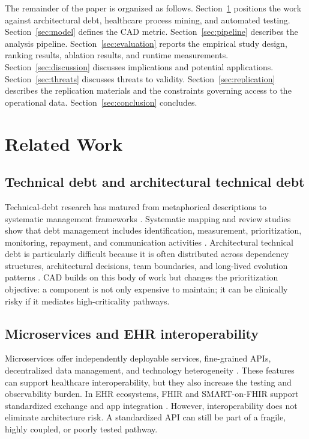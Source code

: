\documentclass[english,preprint]{elsarticle}
\newcommand{\CAD}{\textsc{CAD}\xspace}
\begin{document}
The remainder of the paper is organized as follows. Section~\ref{sec:related} positions the work against architectural debt, healthcare process mining, and automated testing. Section~\ref{sec:model} defines the \CAD metric. Section~\ref{sec:pipeline} describes the analysis pipeline. Section~\ref{sec:evaluation} reports the empirical study design, ranking results, ablation results, and runtime measurements. Section~\ref{sec:discussion} discusses implications and potential applications. Section~\ref{sec:threats} discusses threats to validity. Section~\ref{sec:replication} describes the replication materials and the constraints governing access to the operational data. Section~\ref{sec:conclusion} concludes.

\section{Related Work}\label{sec:related}

\subsection{Technical debt and architectural technical debt}

Technical-debt research has matured from metaphorical descriptions to systematic management frameworks \cite{Cunningham1992WyCash,Kruchten2012TechnicalDebt,Li2015TechnicalDebt}. Systematic mapping and review studies show that debt management includes identification, measurement, prioritization, monitoring, repayment, and communication activities \cite{Alves2016TechnicalDebt,Rios2018TertiaryStudy,Lenarduzzi2021Prioritization}. Architectural technical debt is particularly difficult because it is often distributed across dependency structures, architectural decisions, team boundaries, and long-lived evolution patterns \cite{Martini2015ATD,Xiao2016ArchitecturalDebt,Soliman2021DesignDecisions,Verdecchia2021Theory}. \CAD builds on this body of work but changes the prioritization objective: a component is not only expensive to maintain; it can be clinically risky if it mediates high-criticality pathways.

\subsection{Microservices and EHR interoperability}

Microservices offer independently deployable services, fine-grained APIs, decentralized data management, and technology heterogeneity \cite{Newman2015Microservices,Dragoni2017Microservices,Soldani2018PainsGains,Taibi2017Microservices}. These features can support healthcare interoperability, but they also increase the testing and observability burden. In EHR ecosystems, FHIR and SMART-on-FHIR support standardized exchange and app integration \cite{FHIR2026,Mandel2016SMART}. However, interoperability does not eliminate architecture risk. A standardized API can still be part of a fragile, highly coupled, or poorly tested pathway.
\end{document}
